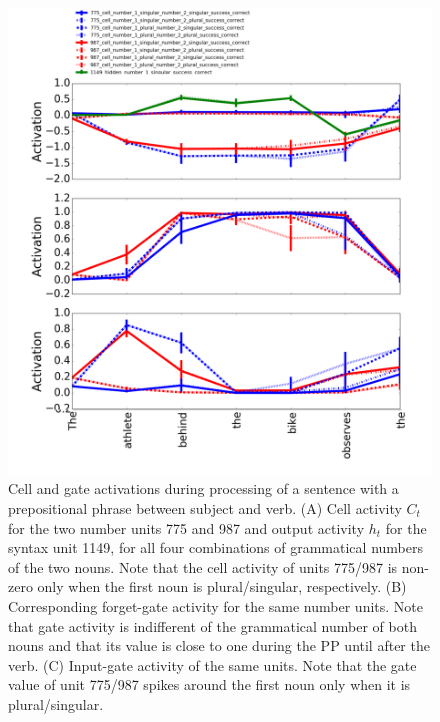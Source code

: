 \begin{figure}[t]
\includegraphics[width=\linewidth]{Figures/Figure2_number_units.png}
\caption{Cell and gate activations during processing of a sentence with a prepositional phrase between subject and verb. (A) Cell activity $C_t$ for the two number units 775 and 987 and output activity $h_t$ for the syntax unit 1149, for all four combinations of grammatical numbers of the two nouns. Note that the cell activity of units 775/987 is non-zero only when the first noun is plural/singular, respectively. (B) Corresponding forget-gate activity for the same number units. Note that gate activity is indifferent of the grammatical number of both nouns and that its value is close to one during the PP until after the verb. (C) Input-gate activity of the same units. Note that the gate value of unit 775/987 spikes around the first noun only when it is plural/singular.}
\end{figure}

\lipsum[1]

